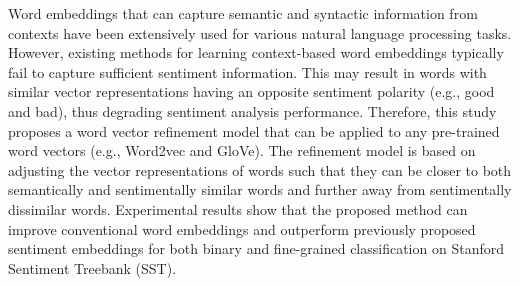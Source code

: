 Word embeddings that can capture semantic and syntactic information from contexts have been extensively used for various natural language processing tasks. However, existing methods for learning context-based word embeddings typically fail to capture sufficient sentiment information. This may result in words with similar vector representations having an opposite sentiment polarity (e.g., good and bad), thus degrading sentiment analysis performance. Therefore, this study proposes a word vector refinement model that can be applied to any pre-trained word vectors (e.g., Word2vec and GloVe). The refinement model is based on adjusting the vector representations of words such that they can be closer to both semantically and sentimentally similar words and further away from sentimentally dissimilar words. Experimental results show that the proposed method can improve conventional word embeddings and outperform previously proposed sentiment embeddings for both binary and fine-grained classification on Stanford Sentiment Treebank (SST).

